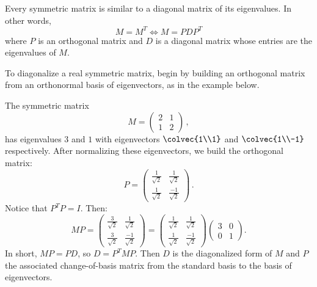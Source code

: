 \begin{theorem}
Every symmetric matrix is similar to a diagonal matrix of its eigenvalues.  In other words,
\[
M=M^T \Leftrightarrow M=PDP^T
\]
where $P$ is an orthogonal matrix and $D$ is a diagonal matrix whose entries are the eigenvalues of $M$.
\end{theorem}


To diagonalize a real symmetric matrix, begin by building an orthogonal matrix from an orthonormal basis of eigenvectors, as in the example below. 

\begin{example}
The symmetric matrix 
$$M=\begin{pmatrix}2&1\\1&2\end{pmatrix}\,  ,$$ has eigenvalues $3$ and $1$ with eigenvectors $\colvec{1\\1}$ and $\colvec{1\\-1}$ respectively.  After normalizing these eigenvectors, we  build the orthogonal matrix:
\[
P = \begin{pmatrix}
\frac{1}{\sqrt{2}} & \frac{1}{\sqrt{2}} \\[2mm]
\frac{1}{\sqrt{2}} & \frac{-1}{\sqrt{2}}
\end{pmatrix}\, .
\]
Notice that $P^TP=I$.  Then:
\[
MP = \begin{pmatrix}
\frac{3}{\sqrt{2}} & \frac{1}{\sqrt{2}} \\[2mm]
\frac{3}{\sqrt{2}} & \frac{-1}{\sqrt{2}}
\end{pmatrix} = 
\begin{pmatrix}
\frac{1}{\sqrt{2}} & \frac{1}{\sqrt{2}} \\[2mm]
\frac{1}{\sqrt{2}} & \frac{-1}{\sqrt{2}}
\end{pmatrix} \begin{pmatrix}
3 & 0 \\[2mm]
0 & 1
\end{pmatrix}.
\]
In short, $MP=PD$, so $D=P^TMP$.  Then $D$ is the diagonalized form of $M$ and $P$ the associated change-of-basis matrix from the standard basis to the basis of eigenvectors.
\end{example}













